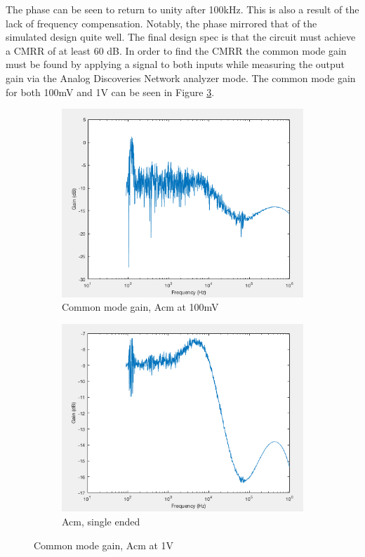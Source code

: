 The phase can be seen to return to unity after 100kHz. This is also a result of the lack of frequency compensation. Notably, the phase mirrored that of the simulated design quite well. The final design spec is that the circuit must achieve a CMRR of at least 60 dB. In order to find the CMRR the common mode gain must be found by applying a signal to both inputs while measuring the output gain via the Analog Discoveries Network analyzer mode. The common mode gain for both 100mV and 1V can be seen in Figure \ref{fig:acmexp}.


\begin{figure}[H]
	\centering
	\begin{subfigure}[b]{0.45\textwidth}
		\centering
		\includegraphics[width=\textwidth]{ExperimentalImplementation/Acm_100mv.png}
		\caption{Common mode gain, Acm at 100mV}
		\label{fig:blue_led}
	\end{subfigure}
	\hfill
	\begin{subfigure}[b]{0.45\textwidth}
		\centering
		\includegraphics[width=\textwidth]{ExperimentalImplementation/Acm_1v.png}
		\caption{Acm, single ended}
		\label{fig:blue_led}
	\end{subfigure}
	\caption{Common mode gain, Acm at 1V}
	\label{fig:acmexp}
\end{figure} 

